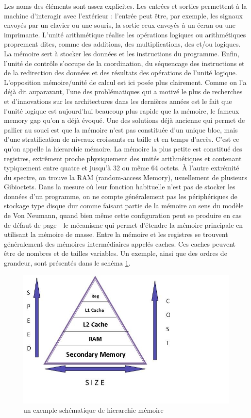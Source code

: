 \documentclass{report}
\begin{document}
Les noms des éléments sont assez explicites. Les entrées et sorties permettent à la machine d'interagir
avec l'extérieur : l'entrée peut être, par exemple, les signaux envoyés par un clavier ou une souris,
la sortie ceux envoyés à un écran ou une imprimante. L'unité arithmétique réalise les opérations logiques
ou arithmétiques proprement dites, comme des additions, des multiplications, des et/ou logiques. 
La mémoire sert à stocker les données et les instructions du programme. Enfin, l'unité de contrôle
s'occupe de la coordination, du séquencage des instructions et de la redirection des données et des
résultats des opérations de l'unité logique. 
\\L'opposition mémoire/unité de calcul est ici posée plus clairement. Comme on l'a déjà dit auparavant,
l'une des problématiques qui a motivé le plus de recherches et d'innovations sur les architectures dans
les dernières années est le fait que l'unité logique est aujourd'hui beaucoup plus rapide que la mémoire,
le fameux memory gap qu'on a déjà évoqué. Une des solutions déjà ancienne qui permet de pallier au souci
est que la mémoire n'est pas constituée d'un unique bloc, mais d'une stratification de niveaux croissants
en taille et en temps d'accès. C'est ce qu'on appelle la hierarchie mémoire. La mémoire la plus petite est
constitué des registres, extrêment proche physiquement des unités arithmétiques et contenant typiquement
entre quatre et jusqu'à 32  ou même 64 octets. À l'autre extrémité du spectre, on trouve la RAM 
(random-access Memory), usuellement de plusieurs Gibioctets. Dans la mesure où leur fonction habituelle 
n'est pas de stocker les données d'un programme, on ne compte généralement pas les périphériques de 
stockage type disque dur comme faisant partie de la mémoire au sens du modèle de Von Neumann, quand 
bien même cette configuration peut se produire en cas de défaut de page - le mécanisme qui permet 
d'étendre la mémoire principale en utilisant la mémoire de masse. Entre la mémoire et les registres 
se trouvent généralement des mémoires intermédiaires appelés caches. Ces caches peuvent être de nombres 
et de tailles variables. Un exemple, ainsi que des ordres de grandeur, sont présentés dans le schéma 
\ref{fig:memhier}.
\begin{figure}
	\includegraphics[scale=1]{hierar.jpg}
  \caption{un exemple schématique de hierarchie mémoire}
  \label{fig:memhier}
\end{figure}
\end{document}
